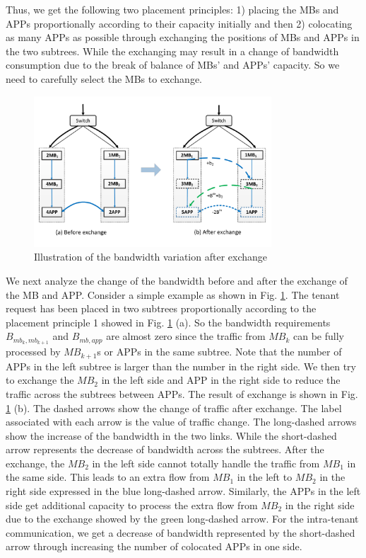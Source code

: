 \documentclass[review]{elsarticle}
\begin{document}
Thus, we get the following two placement principles: 1) placing the MBs and APPs proportionally according to their capacity initially and then 2) colocating as many APPs as possible through exchanging the positions of MBs and APPs in the two subtrees. While the exchanging may result in a change of bandwidth consumption due to the break of balance of MBs’ and APPs’ capacity. So we need to carefully select the MBs to exchange. 

\begin{figure}
	\centering
	\includegraphics[width=3.5in]{fig/exchange_example.pdf}
	\caption{Illustration of the bandwidth variation after exchange}
    \label{fig:exchange}
\end{figure}
We next analyze the change of the bandwidth before and after the exchange of the MB and APP. Consider a simple example as shown in Fig. \ref{fig:exchange}. The tenant request has been placed in two subtrees proportionally according to the placement principle 1 showed in Fig. \ref{fig:exchange} (a). So the bandwidth requirements $B_{mb_k,mb_{k+1}}$ and $B_{mb,app}$ are almost zero since the traffic from $MB_k$ can be fully processed by $MB_{k+1}$s or APPs in the same subtree. Note that the number of APPs in the left subtree is larger than the number in the right side. We then try to exchange the $MB_2$ in the left side and APP in the right side to reduce the traffic across the subtrees between APPs. The result of exchange is shown in Fig. \ref{fig:exchange} (b). The dashed arrows show the change of traffic after exchange. The label associated with each arrow is the value of traffic change. %
 The long-dashed arrows show the increase of the bandwidth in the two links. While the short-dashed arrow represents the decrease of bandwidth across the subtrees. After the exchange, the $MB_2$ in the left side cannot totally handle the traffic from $MB_1$ in the same side. This leads to an extra flow from $MB_1$ in the left to $MB_2$ in the right side expressed in the blue long-dashed arrow. Similarly, the APPs in the left side get additional capacity to process the extra flow from $MB_2$ in the right side due to the exchange showed by the green long-dashed arrow. For the intra-tenant communication, we get a decrease of bandwidth represented by the short-dashed arrow through increasing the number of colocated APPs in one side. 
\end{document}
